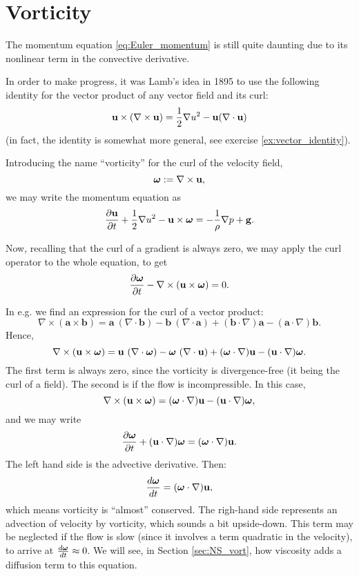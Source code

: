 \section{Vorticity}
\label{sec:Euler_vorticity}

The momentum equation \ref{eq:Euler_momentum} is still quite daunting
due to its nonlinear term in the convective derivative.

In order to make progress, it was Lamb's idea in 1895 to use the
following identity for the vector product of any vector field and its
curl:
\begin{equation}
  \label{eq:Lambs_identity}
  \mathbf{u} \times ( \nabla\times \mathbf{u}) =
  \frac12 \nabla u^2 - \mathbf{u} (\nabla\cdot\mathbf{u} )
\end{equation}
(in fact, the identity is somewhat more general, see exercise
\ref{ex:vector_identity}).

Introducing the name ``vorticity'' for the curl of the velocity field,
\[
\bm{\omega} := \nabla\times\mathbf{u} ,
\]
we may write the momentum equation as
\begin{equation}
  \label{eq:Euler_momentum_w_vort}
  \frac{\partial \mathbf{u} }{\partial t} +
  \frac12 \nabla u^2 - \mathbf{u} \times\bm{\omega} =
  - \frac{1}{\rho} \nabla p 
  + \mathbf{g} .
\end{equation}

Now, recalling that the curl of a gradient is always zero,
we may apply the curl operator to the whole equation, to get
\[
\frac{\partial \bm{\omega} }{\partial t} -
\nabla\times(\mathbf{u}\times\bm{\omega}) = 0 .
\]

In e.g. \cite{wiki:Vector_calculus_identities} we find an expression
for the curl of a vector product:
\[
  \nabla \times (\mathbf {a} \times \mathbf {b} ) =
  \mathbf {a} \ (\nabla \cdot \mathbf {b} )
  -\mathbf {b} \ (\nabla \cdot \mathbf {a} )
  +(\mathbf {b} \cdot \nabla )\mathbf {a}
  -(\mathbf {a} \cdot \nabla )\mathbf {b} .
\]
Hence,
\[
  \nabla \times (\mathbf{u} \times \bm{\omega} ) =
  \mathbf{u} \ (\nabla \cdot \bm{\omega} )
  -\bm{\omega} \ (\nabla \cdot \mathbf{u} )
  +(\bm{\omega} \cdot \nabla )\mathbf{u}
  -(\mathbf{u} \cdot \nabla )\bm{\omega}.
\]
The first term is always zero, since the vorticity is divergence-free
(it being the curl of a field). The second is if the flow is
incompressible. In this case,
\begin{equation}
  \label{eq:conv_accel_as_vort}
  \nabla \times (\mathbf{u} \times \bm{\omega} ) =
  (\bm{\omega} \cdot \nabla )\mathbf{u}
  -(\mathbf{u} \cdot \nabla )\bm{\omega},
\end{equation}
and we may write
\[
  \frac{\partial \bm{\omega} }{\partial t}
  + ( \mathbf{u} \cdot \nabla )\bm{\omega} =  (\bm{\omega} \cdot \nabla )\mathbf{u} .
\]
The left hand side is the advective derivative. Then:
\[
  \frac{d \bm{\omega} }{d t}  =  (\bm{\omega} \cdot \nabla )\mathbf{u} ,
\]
which means vorticity is ``almost'' conserved. The righ-hand side
represents an advection of velocity by vorticity, which sounds a bit
upside-down. This term may be neglected if the flow is slow (since it
involves a term quadratic in the velocity), to arrive at
$\frac{d \bm{\omega} }{d t}\approx 0$. We will see, in Section
\ref{sec:NS_vort}, how viscosity adds a diffusion term to this
equation.


